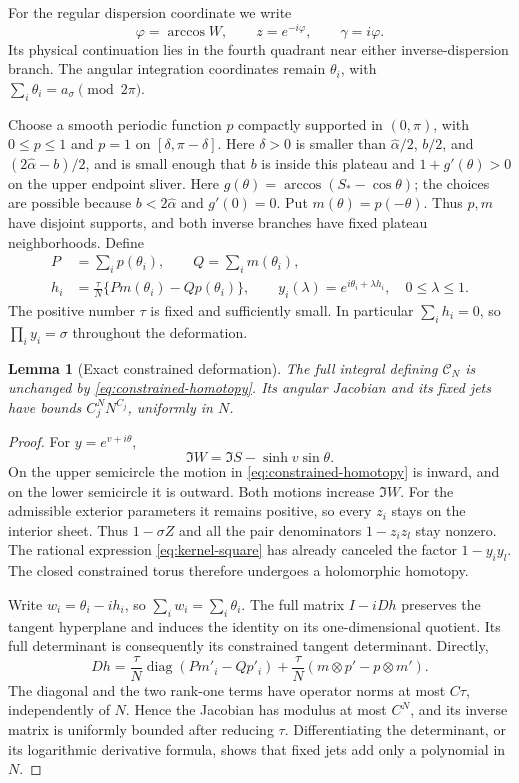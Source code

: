 \documentclass[11pt]{article}
\numberwithin{equation}{section}
\newtheorem{lemma}[theorem]{Lemma}
\theoremstyle{remark}\newtheorem{remark}[theorem]{Remark}
\begin{document}
For the regular dispersion coordinate we write
\[
 \varphi=\arccos W,\qquad z=e^{-i\varphi},\qquad
 \gamma=i\varphi.
\]
Its physical continuation lies in the fourth quadrant near either
inverse-dispersion branch.  The angular integration coordinates remain
$\theta_i$, with $\sum_i\theta_i=a_\sigma\pmod {2\pi}$.

Choose a smooth periodic function $p$ compactly supported in $(0,\pi)$,
with $0\le p\le1$ and $p=1$ on $[\delta,\pi-\delta]$.
Here $\delta>0$ is smaller than $\widehat\alpha/2$, $b/2$, and
$(2\widehat\alpha-b)/2$, and is small enough that $b$ is inside this
plateau and $1+g'(\theta)>0$ on the upper endpoint sliver.
Here $g(\theta)=\arccos(S_*-\cos\theta)$; the choices are
possible because $b<2\widehat\alpha$ and $g'(0)=0$.  Put $m(\theta)=p(-\theta)$.  Thus $p,m$ have
disjoint supports, and both inverse branches have fixed plateau
neighborhoods.  Define
\begin{equation}\label{eq:constrained-homotopy}
 \begin{aligned}
 P&=\sum_i p(\theta_i),\qquad Q=\sum_i m(\theta_i),\\
 h_i&=\frac\tau N\{P m(\theta_i)-Q p(\theta_i)\},\qquad
 y_i(\lambda)=e^{i\theta_i+\lambda h_i},\quad 0\le\lambda\le1.
 \end{aligned}
\end{equation}
The positive number $\tau$ is fixed and sufficiently small.  In
particular $\sum_i h_i=0$, so $\prod_i y_i=\sigma$ throughout the
deformation.

\begin{lemma}[Exact constrained deformation]
\label{lem:constrained-homotopy}
The full integral defining $\mathcal C_N$ is unchanged by
\eqref{eq:constrained-homotopy}.  Its angular Jacobian and its fixed
jets have bounds $C_j^N N^{C_j}$, uniformly in $N$.
\end{lemma}
\begin{proof}
For $y=e^{v+i\theta}$,
\[
 \Im W=\Im S-\sinh v\sin\theta.
\]
On the upper semicircle the motion in
\eqref{eq:constrained-homotopy} is inward, and on the lower
semicircle it is outward.  Both motions increase $\Im W$.
For the admissible exterior parameters it remains positive, so every
$z_i$ stays on the interior sheet.  Thus $1-\sigma Z$ and all the pair
denominators $1-z_i z_l$ stay nonzero. The rational expression
\eqref{eq:kernel-square} has already canceled the factor $1-y_i y_l$.
The closed constrained torus therefore undergoes a holomorphic
homotopy.

Write $w_i=\theta_i-i h_i$, so $\sum_iw_i=\sum_i\theta_i$.
The full matrix $I-iDh$ preserves the tangent hyperplane and induces
the identity on its one-dimensional quotient.  Its full determinant
is consequently its constrained tangent determinant.  Directly,
\[
 Dh=\frac\tau N\operatorname{diag}(P m'_i-Qp'_i)
       +\frac\tau N(m\otimes p'-p\otimes m').
\]
The diagonal and the two rank-one terms have operator norms at most
$C\tau$, independently of $N$.  Hence the Jacobian has modulus at
most $C^N$, and its inverse matrix is uniformly bounded after reducing
$\tau$.  Differentiating the determinant, or its logarithmic derivative
formula, shows that fixed jets add only a polynomial in $N$.
\end{proof}
\end{document}
